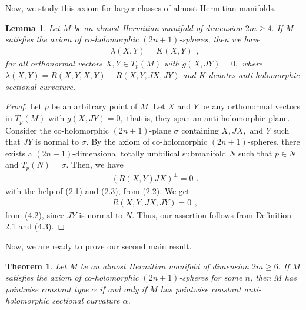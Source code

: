 \documentclass{amsart}
\newtheorem{theorem}{Theorem}[section]
\newtheorem*{theorem A}{Theorem A}
\newtheorem*{theorem B}{N\"olker's Theorem}
\newtheorem{lemma}{Lemma}[section]
\theoremstyle{remark}
\theoremstyle{remark}
\theoremstyle{definition}
\numberwithin{equation}{section}
\begin{document}
Now, we study this axiom for larger classes of almost Hermitian
manifolds.
\begin{lemma}
Let $M$ be an almost Hermitian manifold of dimension $2m\geq4.$ If
$M$ satisfies the axiom of co-holomorphic $(2n+1)$-spheres, then we
have
\begin{equation}
\label{e1}
\begin{array}{c}
\lambda(X,Y)=K(X,Y)
\end{array},
\end{equation}
for all orthonormal vectors $X,Y\in T_{p}(M)$ with $g(X,JY)=0,$
where $\lambda(X,Y)=R(X,Y,X,Y)-R(X,Y,JX,JY)$ and $K$ denotes
anti-holomorphic sectional curvature.
\end{lemma}
\begin{proof}
Let $p$ be an arbitrary point of $M$. Let $X$ and $Y$  be any
orthonormal vectors in $T_{p}(M)$ with $g(X,JY)=0,$ that is, they
span an anti-holomorphic plane. Consider the co-holomorphic
$(2n+1)$-plane $\sigma$ containing $X,JX,$ and $Y$ such that $JY$ is
normal to $\sigma$. By the axiom of co-holomorphic $(2n+1)$-spheres,
there exists a $(2n+1)$-dimensional totally umbilical submanifold
$N$ such that $p\in N$ and $T_{p}(N)=\sigma.$ Then, we have
\begin{equation}
\label{e1}
\begin{array}{c}
(R(X,Y)JX)^{\bot}=0
\end{array}.
\end{equation}
 with the help of
(2.1) and (2.3), from (2.2). We get
\begin{equation}
\label{e1}
\begin{array}{c}
R(X,Y,JX,JY)=0
\end{array},
\end{equation}
from (4.2), since $JY$ is normal to $N$. Thus, our assertion follows
from Definition 2.1 and (4.3).
\end{proof}
Now, we are ready to prove our second main result.
\begin{theorem}
Let $M$ be an  almost Hermitian manifold of dimension $2m\geq6.$ If
$M$ satisfies the axiom of co-holomorphic $(2n+1)$-spheres for some
$n$, then $M$ has pointwise constant type $\alpha$ if and only if
$M$ has pointwise constant anti-holomorphic sectional curvature
$\alpha$.
\end{theorem}
\end{document}
